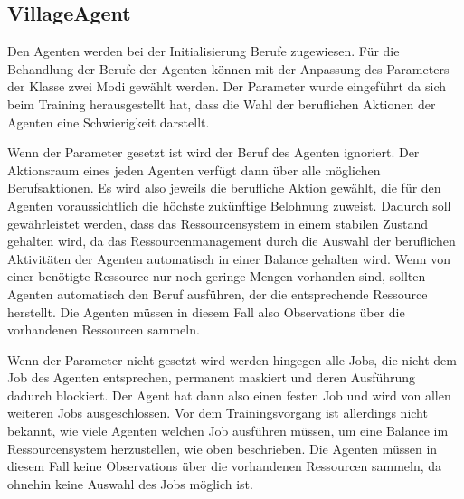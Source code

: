 \subsection{VillageAgent}\label{village_village_agent}
Den Agenten werden bei der Initialisierung Berufe zugewiesen. Für die Behandlung der Berufe der Agenten können mit der Anpassung des Parameters  der Klasse  zwei Modi gewählt werden. Der Parameter wurde eingeführt da sich beim Training herausgestellt hat, dass die Wahl der beruflichen Aktionen der Agenten eine Schwierigkeit darstellt.

Wenn der Parameter gesetzt ist wird der Beruf des Agenten ignoriert. Der Aktionsraum eines jeden Agenten verfügt dann über alle möglichen Berufsaktionen. Es wird also jeweils die berufliche Aktion gewählt, die für den Agenten voraussichtlich die höchste zukünftige Belohnung zuweist. Dadurch soll gewährleistet werden, dass das Ressourcensystem in einem stabilen Zustand gehalten wird, da das Ressourcenmanagement durch die Auswahl der beruflichen Aktivitäten der Agenten automatisch in einer Balance gehalten wird. Wenn von einer benötigte Ressource nur noch geringe Mengen vorhanden sind, sollten Agenten automatisch den Beruf ausführen, der die entsprechende Ressource herstellt. Die Agenten müssen in diesem Fall also Observations über die vorhandenen Ressourcen sammeln.    

Wenn der Parameter  nicht gesetzt wird werden hingegen alle Jobs, die nicht dem Job des Agenten entsprechen, permanent maskiert und deren Ausführung dadurch blockiert. Der Agent hat dann also einen festen Job und wird von allen weiteren Jobs ausgeschlossen. Vor dem Trainingsvorgang ist allerdings nicht bekannt, wie viele Agenten welchen Job ausführen müssen, um eine Balance im Ressourcensystem herzustellen, wie oben beschrieben. Die Agenten müssen in diesem Fall keine Observations über die vorhandenen Ressourcen sammeln, da ohnehin keine Auswahl des Jobs möglich ist.    


